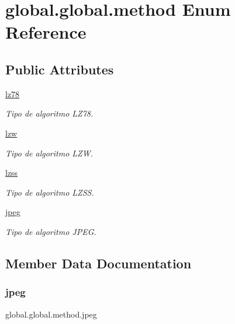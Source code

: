\hypertarget{enumglobal_1_1global_1_1method}{}\section{global.\+global.\+method Enum Reference}
\label{enumglobal_1_1global_1_1method}
\subsection*{Public Attributes}
\begin{DoxyCompactItemize}
\item 
\hyperlink{enumglobal_1_1global_1_1method_a971c6941fa1f40ab14f8cf618d7eebad}{lz78}
\begin{DoxyCompactList}\small\item\em Tipo de algoritmo L\+Z78. \end{DoxyCompactList}\item 
\hyperlink{enumglobal_1_1global_1_1method_a2ada2689021efdc8039d00a68316d8e1}{lzw}
\begin{DoxyCompactList}\small\item\em Tipo de algoritmo L\+ZW. \end{DoxyCompactList}\item 
\hyperlink{enumglobal_1_1global_1_1method_ac492bab38a149575fb93357e307c9221}{lzss}
\begin{DoxyCompactList}\small\item\em Tipo de algoritmo L\+Z\+SS. \end{DoxyCompactList}\item 
\hyperlink{enumglobal_1_1global_1_1method_a3bf22393b8d5eb9e09ea1e296d9768a3}{jpeg}
\begin{DoxyCompactList}\small\item\em Tipo de algoritmo J\+P\+EG. \end{DoxyCompactList}\end{DoxyCompactItemize}


\subsection{Member Data Documentation}
\mbox{\label{enumglobal_1_1global_1_1method_a3bf22393b8d5eb9e09ea1e296d9768a3}} 
\subsubsection{\texorpdfstring{jpeg}{jpeg}}
{\footnotesize\ttfamily global.\+global.\+method.\+jpeg}



